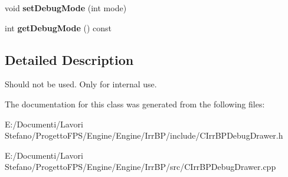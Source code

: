 \begin{DoxyCompactItemize}
\item 
\hypertarget{class_c_irr_b_p_debug_drawer_ac0c787365db5b827e4c461ec11a4be07}{
void {\bfseries setDebugMode} (int mode)}
\label{class_c_irr_b_p_debug_drawer_ac0c787365db5b827e4c461ec11a4be07}

\item 
\hypertarget{class_c_irr_b_p_debug_drawer_af195b57e20e31c217fd9b410c8b73a4f}{
int {\bfseries getDebugMode} () const }
\label{class_c_irr_b_p_debug_drawer_af195b57e20e31c217fd9b410c8b73a4f}

\end{DoxyCompactItemize}


\subsection{Detailed Description}
Should not be used. Only for internal use. 

The documentation for this class was generated from the following files:\begin{DoxyCompactItemize}
\item 
E:/Documenti/Lavori Stefano/ProgettoFPS/Engine/Engine/IrrBP/include/CIrrBPDebugDrawer.h\item 
E:/Documenti/Lavori Stefano/ProgettoFPS/Engine/Engine/IrrBP/src/CIrrBPDebugDrawer.cpp\end{DoxyCompactItemize}
